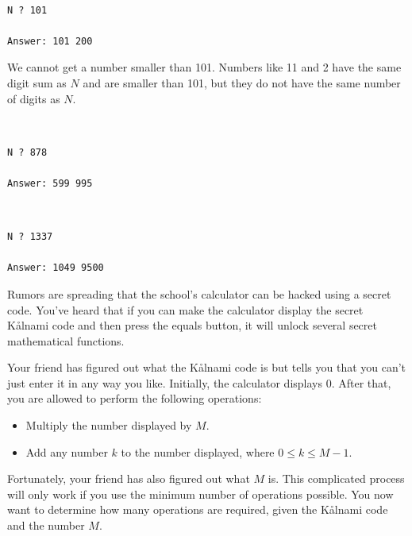 \vspace{0.5cm}  
\\
\vspace{-0.3cm}
\begin{verbatim}
N ? 101

Answer: 101 200
\end{verbatim}
 We cannot get a number smaller than 101. 
Numbers like 11 and 2 have the same digit sum as $N$ and are smaller than 101, 
but they do not have the same number of digits as $N$.


\vspace{0.3cm}
\\
\vspace{-0.3cm}
\begin{verbatim}
N ? 878

Answer: 599 995
\end{verbatim}
\vspace{0.3cm}

\\
\vspace{-0.3cm}
\begin{verbatim}
N ? 1337

Answer: 1049 9500
\end{verbatim}


\newpage
{}

Rumors are spreading that the school's calculator can be hacked using a secret code.  
You've heard that if you can make the calculator display the secret Kålnami code and then press the equals button, 
it will unlock several secret mathematical functions.  

Your friend has figured out what the Kålnami code is but tells you that you can't just enter it in any way you like.  
Initially, the calculator displays $0$. After that, you are allowed to perform the following operations:  
\begin{itemize}
  \item Multiply the number displayed by $M$.
  \item Add any number $k$ to the number displayed, where $0 \leq k \leq M-1$.
\end{itemize}  

Fortunately, your friend has also figured out what $M$ is.  
This complicated process will only work if you use the minimum number of operations possible.  
You now want to determine how many operations are required, given the Kålnami code and the number $M$.  

